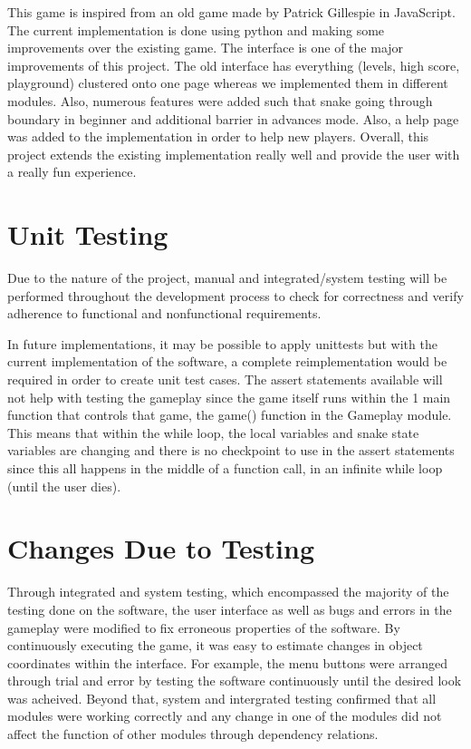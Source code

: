 \documentclass[12pt, titlepage]{article}
\begin{document}
This game is inspired from an old game made by Patrick Gillespie in JavaScript. The current implementation is done using python and making some improvements over the existing game. The interface is one of the major improvements of this project. The old interface has everything (levels, high score, playground) clustered onto one page whereas we implemented them in different modules. Also, numerous features were added such that snake going through boundary in beginner and additional barrier in advances mode. Also, a help page was added to the implementation in order to help new players. Overall, this project extends the existing implementation really well and provide the user with a really fun experience.

\section{Unit Testing}

Due to the nature of the project, manual and integrated/system testing will be performed throughout the development process to check for correctness and verify adherence to functional and nonfunctional requirements.

In future implementations, it may be possible to apply unittests but with the current implementation of the software, a complete reimplementation would be required in order to create unit test cases. The assert statements available will not help with testing the gameplay since the game itself runs within the 1 main function that controls that game, the game() function in the Gameplay module. This means that within the while loop, the local variables and snake state variables are changing and there is no checkpoint to use in the assert statements since this all happens in the middle of a function call, in an infinite while loop (until the user dies).

\section{Changes Due to Testing}
Through integrated and system testing, which encompassed the majority of the testing done on the software, the user interface as well as bugs and errors in the gameplay were modified to fix erroneous properties of the software. By continuously executing the game, it was easy to estimate changes in object coordinates within the interface. For example, the menu buttons were arranged through trial and error by testing the software continuously until the desired look was acheived. Beyond that, system and intergrated testing confirmed that all modules were working correctly and any change in one of the modules did not affect the function of other modules through dependency relations.
\end{document}
